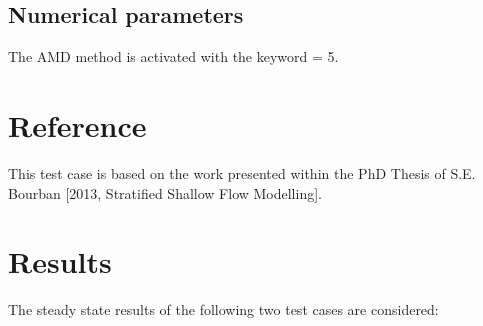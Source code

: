 \subsection{Numerical parameters}
The AMD method is activated with the keyword  = 5.

\section{Reference}
This test case is based on the work presented within the PhD Thesis of S.E.
Bourban [2013, Stratified Shallow Flow Modelling].

\section{Results}
The steady state results of the following two test cases are considered:

